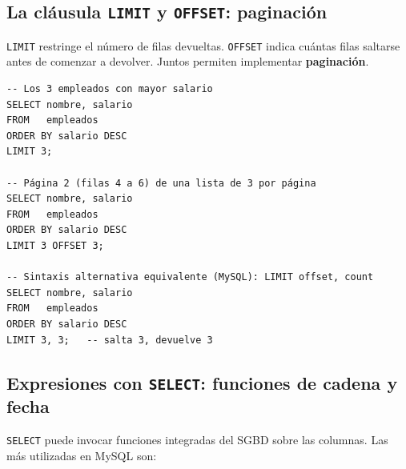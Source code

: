 \subsection{La cláusula \texttt{LIMIT} y \texttt{OFFSET}: paginación}

\texttt{LIMIT} restringe el número de filas devueltas.
\texttt{OFFSET} indica cuántas filas saltarse antes de comenzar
a devolver. Juntos permiten implementar \textbf{paginación}.

\begin{lstlisting}[caption={LIMIT y OFFSET para paginación.}]
-- Los 3 empleados con mayor salario
SELECT nombre, salario
FROM   empleados
ORDER BY salario DESC
LIMIT 3;

-- Página 2 (filas 4 a 6) de una lista de 3 por página
SELECT nombre, salario
FROM   empleados
ORDER BY salario DESC
LIMIT 3 OFFSET 3;

-- Sintaxis alternativa equivalente (MySQL): LIMIT offset, count
SELECT nombre, salario
FROM   empleados
ORDER BY salario DESC
LIMIT 3, 3;   -- salta 3, devuelve 3
\end{lstlisting}

\subsection{Expresiones con \texttt{SELECT}: funciones de cadena y fecha}

\texttt{SELECT} puede invocar funciones integradas del SGBD sobre
las columnas.
Las más utilizadas en MySQL son:

